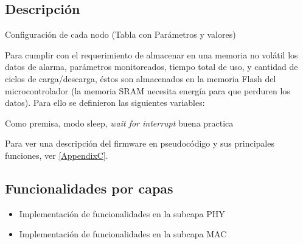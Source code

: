 {%


\subsection{Descripción}
\label{subsec:desc} 

Configuración de cada nodo (Tabla con Parámetros y valores)

Para cumplir con el requerimiento de almacenar en una memoria no volátil los datos de alarma, parámetros monitoreados, tiempo total de uso, y cantidad de ciclos de carga/descarga, éstos son almacenados en la memoria Flash del microcontrolador (la memoria SRAM necesita energía para que perduren los datos). Para ello se definieron las siguientes variables:
    

Como premisa, modo sleep,
\textit{wait for interrupt} buena practica

Para ver una descripción del firmware en pseudocódigo y sus principales funciones, ver \ref{AppendixC}.

\subsection{Funcionalidades por capas}
\label{subsec:func} 
\begin{itemize}
	\item Implementación de funcionalidades en la subcapa PHY
	
	\item Implementación de funcionalidades en la subcapa MAC


\end{itemize}}
